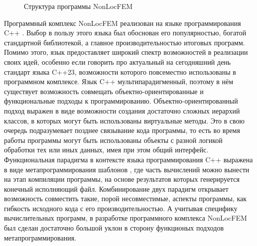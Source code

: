 \begin{figure}[ht]
    \caption{Структура программы NonLocFEM}\label{pic:NonLocFEMSchema}
\end{figure}

Программный комплекс NonLocFEM реализован на языке программирования C++ \cite{CppReference}. Выбор в пользу этого языка был обоснован его популярностью, богатой стандартной библиотекой, а главное производительностью итоговых программ. Помимо этого, язык предоставляет широкий спектр возможностей в реализации своих идей, особенно если говорить про актуальный на сегодняшний день стандарт языка C++23, возможности которого повсеместно использованы в программном комплексе. Язык C++ мультипарадигменный, поэтому в нём существует возможность совмещать объектно-ориентированные и функциональные подходы к программированию. Объектно-ориентированный подход выражен в виде возможности создания достаточно сложных иерархий классов, в которых могут быть использованы виртуальные методы. Это в свою очередь подразумевает позднее связывание кода программы, то есть во время работы программы могут быть использованы объекты с разной логикой обработки тех или иных данных, имея при этом общий интерфейс. Функциональная парадигма в контексте языка программирования C++ выражена в виде метапрограммирования шаблонов \cite{Alexandresku, Vandevoorde}, где часть вычислений можно вынести на этап компиляции программы, на основе результатов которых генерируется конечный исполняющий файл. Комбинирование двух парадигм открывает возможность совместить такие, порой несовместимые, аспекты программы, как гибкость исходного кода с его производительностью. А учитывая специфику вычислительных программ, в разработке программного комплекса NonLocFEM был сделан достаточно большой уклон в сторону функционых подходов метапрограммирования.

